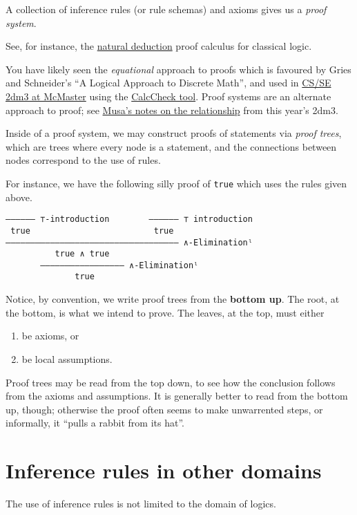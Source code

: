 \documentclass[11pt]{article}
\begin{document}
A collection of inference rules (or rule schemas)
and axioms gives us a \emph{proof system}.

See, for instance,
the \href{https://cs.uwaterloo.ca/\~david/cl/natural-deduction-pfenning.pdf}{natural deduction} proof calculus
for classical logic.

You have likely seen the \emph{equational} approach to proofs
which is favoured by Gries and Schneider's
“A Logical Approach to Discrete Math”, and used in
\href{https://www.cas.mcmaster.ca/\~kahl/CS2DM3/2020/}{CS/SE 2dm3 at McMaster}
using the \href{http://calccheck.mcmaster.ca/}{CalcCheck tool}.
Proof systems are an alternate approach to proof;
see \href{https://alhassy.github.io/CalcCheck/LectureNotes.html\#Rules-of-Equality-and-Proof-Trees-vs-Calculational-Proofs}{Musa's notes on the relationship} from this year's 2dm3.

Inside of a proof system, we may construct proofs of statements
via \emph{proof trees}, which are trees where every node is a statement,
and the connections between nodes correspond to the use of rules.

For instance, we have the following silly proof of \texttt{true} which
uses the rules given above.
\begin{verbatim}
—————— ⊤-introduction        —————— ⊤ introduction
 true                         true
——————————————————————————————————— ∧-Eliminationˡ
          true ∧ true
       ————————————————— ∧-Eliminationˡ
              true
\end{verbatim}

Notice, by convention, we write proof trees
from the \textbf{bottom up}.
The root, at the bottom, is what we intend to prove.
The leaves, at the top, must either
\begin{enumerate}
\item be axioms, or
\item be local assumptions.
\end{enumerate}

Proof trees may be read from the top down,
to see how the conclusion follows from the axioms and assumptions.
It is generally better to read from the bottom up, though;
otherwise the proof often seems to make
unwarrented steps, or informally, it “pulls a rabbit from its hat”.

\section{Inference rules in other domains}
\label{sec:org10c0c45}
The use of inference rules is not limited to the domain of logics.
\end{document}
